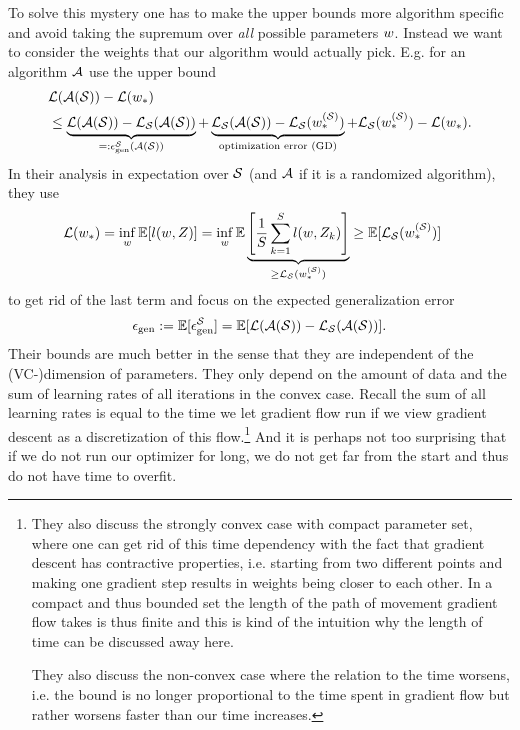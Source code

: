 To solve this mystery one has to make the upper bounds more algorithm specific
and avoid taking the supremum over \emph{all} possible parameters \(w\).
Instead we want to consider the weights that our algorithm would actually pick.
E.g. for an algorithm \(\mathcal{A}\) \textcite{hardtTrainFasterGeneralize2016} use
the upper bound
\begin{align*}
	&\mathcal{L}(\mathcal{A}(\mathcal{S})) - \mathcal{L}(w_*)\\
	&\le \underbrace{\mathcal{L}(\mathcal{A}(\mathcal{S})) - \mathcal{L}_{\mathcal{S}}(\mathcal{A}(\mathcal{S}))}_{
		=: \epsilon_\text{gen}^{\mathcal{S}}(\mathcal{A}(\mathcal{S}))
	}
	+ \underbrace{\mathcal{L}_{\mathcal{S}}(\mathcal{A}(\mathcal{S})) - \mathcal{L}_{\mathcal{S}}(w_*^{(\mathcal{S})})}_{\text{optimization error (GD)}}
	+ \mathcal{L}_{\mathcal{S}}(w_*^{(\mathcal{S})}) - \mathcal{L}(w_*).
\end{align*}
In their analysis in expectation over \(\mathcal{S}\) (and \(\mathcal{A}\) if it is a
randomized algorithm), they use
\begin{align*}
	\mathcal{L}(w_*) &= \inf_{w}\mathbb{E}[l(w, Z)]
	= \inf_{w}\mathbb{E}\underbrace{
		\left[\frac{1}{S}\sum_{k=1}^Sl(w, Z_k)\right]
	}_{\ge \mathcal{L}_{\mathcal{S}}(w_*^{(\mathcal{S})})}
	\ge \mathbb{E}[\mathcal{L}_{\mathcal{S}}(w_*^{(\mathcal{S})})]
\end{align*}
to get rid of the last term and focus on the expected generalization error
\begin{align*}
	\epsilon_{\text{gen}}:=\mathbb{E}[\epsilon_{\text{gen}}^{\mathcal{S}}]
	=\mathbb{E}[\mathcal{L}(\mathcal{A}(\mathcal{S})) - \mathcal{L}_{\mathcal{S}}(\mathcal{A}(\mathcal{S}))].
\end{align*}
Their bounds are much better in the sense that they are independent of
the (VC-)dimension of parameters. They only depend on the amount of data and
the sum of learning rates of all iterations in the convex case. Recall the sum of
all learning rates is equal to the time we let gradient flow run if we view
gradient descent as a discretization of this flow.\footnote{
	They also discuss the strongly convex case with compact parameter set, where
	one can get rid of this time dependency with the fact that gradient descent
	has contractive properties, i.e. starting from two different points and
	making one gradient step results in weights being closer to each other. 
	In a compact and thus bounded set the length of the path of movement gradient
	flow takes is thus finite and this is kind of the intuition why the length
	of time can be discussed away here.

	They also discuss the non-convex case where the relation to the time worsens,
	i.e. the bound is no longer proportional to the time spent in gradient flow
	but rather worsens faster than our time increases.
} And it is perhaps not too surprising that if we
do not run our optimizer for long, we do not get far from the start and thus
do not have time to overfit.

